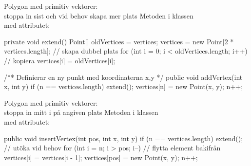 \documentclass{lecturenotes}
\begin{document}
\begin{Slide}{Polygon med primitiv vektorer: \\stoppa in sist och vid behov skapa mer plats}
Metoden  i klassen \\med attributet:  
\begin{Code}[numberstyle=,numbers=left]
    private void extend(){
        Point[] oldVertices = vertices;
        vertices = new Point[2 * vertices.length]; // skapa dubbel plats
        for (int i = 0; i < oldVertices.length; i++) {  // kopiera
            vertices[i] = oldVertices[i];
        }        
    }

    /** Definierar en ny punkt med koordinaterna x,y */
    public void addVertex(int x, int y) {
        if (n == vertices.length) extend();
        vertices[n] = new Point(x, y);
        n++;
    }
\end{Code}
\end{Slide}


\begin{Slide}{Polygon med primitiv vektorer: \\stoppa in mitt i på angiven plats }
Metoden  i klassen \\med attributet:  
\begin{Code}[numberstyle=,numbers=left]
    public void insertVertex(int pos, int x, int y) {
        if (n == vertices.length) extend();   // utöka vid behov
        for (int i = n; i > pos; i--) {       // flytta element bakifrån
            vertices[i] = vertices[i - 1];
        }
        vertices[pos] = new Point(x, y);
        n++;
    }
\end{Code}
\end{Slide}
\end{document}
